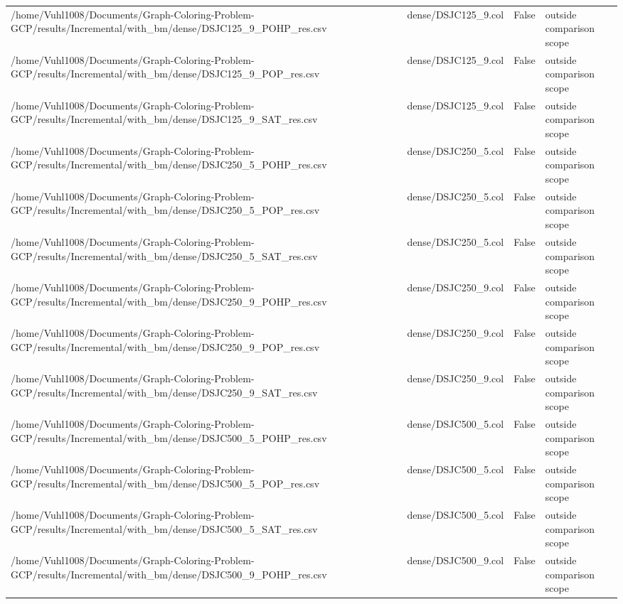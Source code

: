 \begin{table}[htbp]
\begin{tabular}{llll}
/home/Vuhl1008/Documents/Graph-Coloring-Problem-GCP/results/Incremental/with\_bm/dense/DSJC125\_9\_POHP\_res.csv & dense/DSJC125\_9.col & False & outside comparison scope \\
/home/Vuhl1008/Documents/Graph-Coloring-Problem-GCP/results/Incremental/with\_bm/dense/DSJC125\_9\_POP\_res.csv & dense/DSJC125\_9.col & False & outside comparison scope \\
/home/Vuhl1008/Documents/Graph-Coloring-Problem-GCP/results/Incremental/with\_bm/dense/DSJC125\_9\_SAT\_res.csv & dense/DSJC125\_9.col & False & outside comparison scope \\
/home/Vuhl1008/Documents/Graph-Coloring-Problem-GCP/results/Incremental/with\_bm/dense/DSJC250\_5\_POHP\_res.csv & dense/DSJC250\_5.col & False & outside comparison scope \\
/home/Vuhl1008/Documents/Graph-Coloring-Problem-GCP/results/Incremental/with\_bm/dense/DSJC250\_5\_POP\_res.csv & dense/DSJC250\_5.col & False & outside comparison scope \\
/home/Vuhl1008/Documents/Graph-Coloring-Problem-GCP/results/Incremental/with\_bm/dense/DSJC250\_5\_SAT\_res.csv & dense/DSJC250\_5.col & False & outside comparison scope \\
/home/Vuhl1008/Documents/Graph-Coloring-Problem-GCP/results/Incremental/with\_bm/dense/DSJC250\_9\_POHP\_res.csv & dense/DSJC250\_9.col & False & outside comparison scope \\
/home/Vuhl1008/Documents/Graph-Coloring-Problem-GCP/results/Incremental/with\_bm/dense/DSJC250\_9\_POP\_res.csv & dense/DSJC250\_9.col & False & outside comparison scope \\
/home/Vuhl1008/Documents/Graph-Coloring-Problem-GCP/results/Incremental/with\_bm/dense/DSJC250\_9\_SAT\_res.csv & dense/DSJC250\_9.col & False & outside comparison scope \\
/home/Vuhl1008/Documents/Graph-Coloring-Problem-GCP/results/Incremental/with\_bm/dense/DSJC500\_5\_POHP\_res.csv & dense/DSJC500\_5.col & False & outside comparison scope \\
/home/Vuhl1008/Documents/Graph-Coloring-Problem-GCP/results/Incremental/with\_bm/dense/DSJC500\_5\_POP\_res.csv & dense/DSJC500\_5.col & False & outside comparison scope \\
/home/Vuhl1008/Documents/Graph-Coloring-Problem-GCP/results/Incremental/with\_bm/dense/DSJC500\_5\_SAT\_res.csv & dense/DSJC500\_5.col & False & outside comparison scope \\
/home/Vuhl1008/Documents/Graph-Coloring-Problem-GCP/results/Incremental/with\_bm/dense/DSJC500\_9\_POHP\_res.csv & dense/DSJC500\_9.col & False & outside comparison scope \\

\end{tabular}
\end{table}
